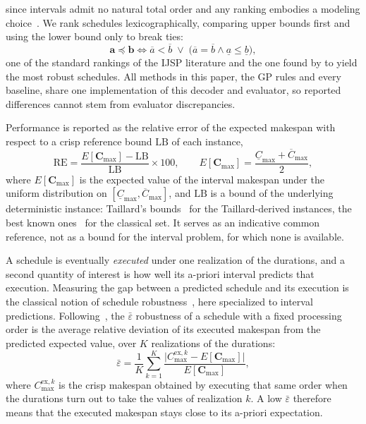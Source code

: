 \documentclass[review,authoryear,11pt]{elsarticle}
\newcommand{\RE}{\mathrm{RE}}
\newcommand{\LB}{\mathrm{LB}}
\begin{document}
since intervals admit no natural total order and any ranking embodies a
modeling choice~\citep{Ishibuchi1990}. We rank schedules
lexicographically, comparing upper bounds first and using the lower
bound only to break ties:
\begin{equation}
\mathbf{a} \preceq \mathbf{b} \iff \overline{a} < \overline{b}
\;\vee\; \big(\overline{a} = \overline{b} \wedge
\underline{a} \le \underline{b}\big),
\label{eq:rank}
\end{equation}
one of the standard rankings of the IJSP literature and the one found
by \citet{DiazGA2020} to yield the most robust schedules. All methods in
this paper, the GP rules and every baseline, share one implementation
of this decoder and evaluator, so reported differences cannot stem from
evaluator discrepancies.

Performance is reported as the relative error of the expected makespan
with respect to a crisp reference bound $\LB$ of each instance,
\begin{equation}
\RE = \frac{E[\mathbf{C}_{\max}] - \LB}{\LB} \times 100,
\qquad
E[\mathbf{C}_{\max}] = \frac{\underline{C}_{\max} +
\overline{C}_{\max}}{2},
\end{equation}
where $E[\mathbf{C}_{\max}]$ is the expected value of the interval
makespan under the uniform distribution on
$[\underline{C}_{\max},\overline{C}_{\max}]$, and $\LB$ is a bound of the
underlying deterministic instance: Taillard's bounds~\citep{Taillard1993} for the
Taillard-derived instances, the best known ones~\citep{DiazFEABC2023} for
the classical set. It serves as an indicative common reference, not as a
bound for the interval problem, for which none is available.

A schedule is eventually \emph{executed} under one realization of the
durations, and a second quantity of interest is how well its a-priori
interval predicts that execution. Measuring the gap between a predicted
schedule and its execution is the classical notion of schedule
robustness~\citep{Leon1994}, here specialized to interval
predictions. Following~\citep{DiazGA2020}, the
$\bar\varepsilon$ robustness of a schedule with a fixed processing order
is the average relative deviation of its executed makespan from the
predicted expected value, over $K$ realizations of the durations:
\begin{equation}
\bar\varepsilon = \frac{1}{K}\sum_{k=1}^{K}
\frac{\big|C^{\mathrm{ex},k}_{\max} - E[\mathbf{C}_{\max}]\big|}
     {E[\mathbf{C}_{\max}]},
\label{eq:eps}
\end{equation}
where $C^{\mathrm{ex},k}_{\max}$ is the crisp makespan obtained by executing that
same order when the durations turn out to take the values of realization
$k$. A low $\bar\varepsilon$ therefore means that the executed makespan
stays close to its a-priori expectation.
\end{document}
